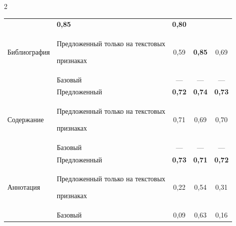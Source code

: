 \begin{multicols}{2}
\begin{table}
\begin{center}
\begin{tabular}{|l|l|c|c|c|}
&\textbf{0,85} &


\textbf{0,80} \\




              Библиография  & Предложенный только на текстовых 


признаках & 0,59 &


        \textbf{0,85} &


0,69 \\




        & {Базовый} & ---& ---&    --- \\


           \hline


& Предложенный & \textbf{0,72} 


&


\textbf{0,74} &


        \textbf{0,73} \\




         {Содержание}    & Предложенный только на текс\-то\-вых 


признаках & 0,71 & 0,69 & 0,70 \\




        & Базовый & --- & --- &--- \\


        \hline


 &  {Предложенный} & \textbf{0,73}  &


\textbf{0,71} & \textbf{0,72} \\




     Аннотация   & Предложенный только на текс\-то\-вых 


признаках & 0,22 & 0,54 & 0,31 \\




        & Базовый & 0,09 & 0,63 & 0,16 \\


                \hline


            \end{tabular}


    \end{center}


    \vspace*{-6pt}


\end{table}









\end{multicols}
